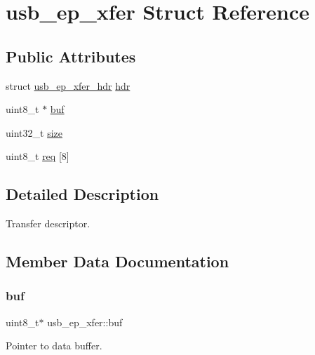 \hypertarget{structusb__ep__xfer}{}\section{usb\+\_\+ep\+\_\+xfer Struct Reference}
\label{structusb__ep__xfer}
\subsection*{Public Attributes}
\begin{DoxyCompactItemize}
\item 
struct \hyperlink{structusb__ep__xfer__hdr}{usb\+\_\+ep\+\_\+xfer\+\_\+hdr} \hyperlink{structusb__ep__xfer_a53cf10010bf001e4a160749ba9ba3182}{hdr}
\item 
uint8\+\_\+t $\ast$ \hyperlink{structusb__ep__xfer_a0bc7b20a280b545c78802cf5681e21e8}{buf}
\item 
uint32\+\_\+t \hyperlink{structusb__ep__xfer_a06f284f1b0744e5da096adf917b9705b}{size}
\item 
uint8\+\_\+t \hyperlink{structusb__ep__xfer_aca9c1de64869e16261275fab5b27e24c}{req} \mbox{[}8\mbox{]}
\end{DoxyCompactItemize}


\subsection{Detailed Description}
Transfer descriptor. 

\subsection{Member Data Documentation}
\mbox{\label{structusb__ep__xfer_a0bc7b20a280b545c78802cf5681e21e8}} 
\subsubsection{\texorpdfstring{buf}{buf}}
{\footnotesize\ttfamily uint8\+\_\+t$\ast$ usb\+\_\+ep\+\_\+xfer\+::buf}

Pointer to data buffer. \mbox{\label{structusb__ep__xfer_a53cf10010bf001e4a160749ba9ba3182}} 
